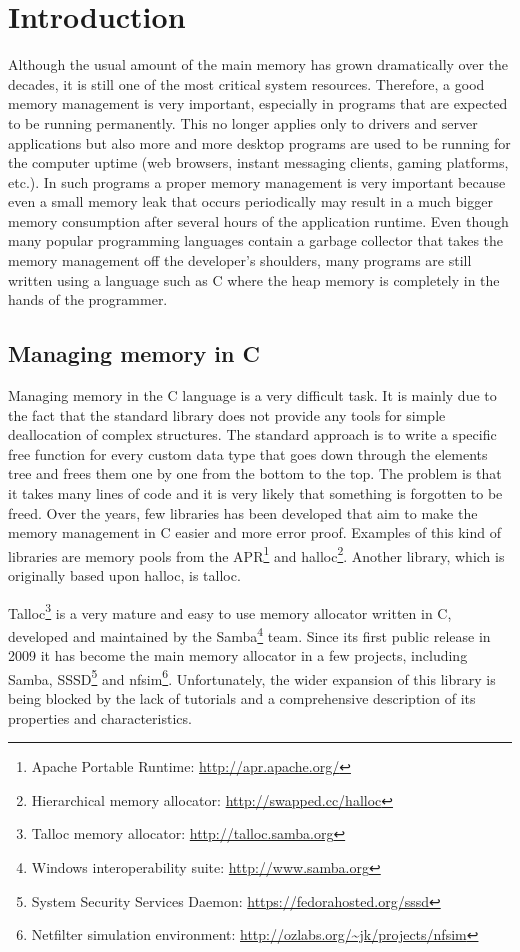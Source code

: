 \chapter{Introduction}

Although the usual amount of the main memory has grown dramatically over the
decades, it is still one of the most critical system resources. Therefore, a
good memory management is very important, especially in programs that are
expected to be running permanently. This no longer applies only to drivers and
server applications but also more and more desktop programs are used to be
running for the computer uptime (web browsers, instant messaging clients,
gaming platforms, etc.). In such programs a proper memory management is very
important because even a small memory leak that occurs periodically may result
in a much bigger memory consumption after several hours of the application
runtime. Even though many popular programming languages contain a garbage
collector that takes the memory management off the developer's shoulders, many
programs are still written using a language such as C\cite{CReference} where the
heap memory is completely in the hands of the programmer.

\section{Managing memory in C}

Managing memory in the C language is a very difficult task. It is mainly due to
the fact that the standard library does not provide any tools for simple
deallocation of complex structures. The standard approach is to write a
specific free function for every custom data type that goes down through the
elements tree and frees them one by one from the bottom to the top. The problem
is that it takes many lines of code and it is very likely that something is
forgotten to be freed. Over the years, few libraries has been developed that
aim to make the memory management in C easier and more error proof. Examples of
this kind of libraries are memory pools from the APR\footnote{Apache Portable
Runtime: \url{http://apr.apache.org/}} and halloc\footnote{Hierarchical memory
allocator: \url{http://swapped.cc/halloc}}. Another library, which is
originally based upon halloc\cite{MailListOrigin}, is talloc.

Talloc\footnote{Talloc memory allocator: \url{http://talloc.samba.org}} is a
very mature and easy to use memory allocator written in C, developed and
maintained by the Samba\footnote{Windows interoperability suite:
\url{http://www.samba.org}} team. Since its first public release in
2009\cite{MailListOrigin} it has become the main memory allocator in a few
projects, including Samba, SSSD\footnote{System Security Services Daemon:
\url{https://fedorahosted.org/sssd}} and nfsim\footnote{Netfilter simulation
environment: \url{http://ozlabs.org/~jk/projects/nfsim}}. Unfortunately, the
wider expansion of this library is being blocked by the lack of tutorials and a
comprehensive description of its properties and characteristics.

